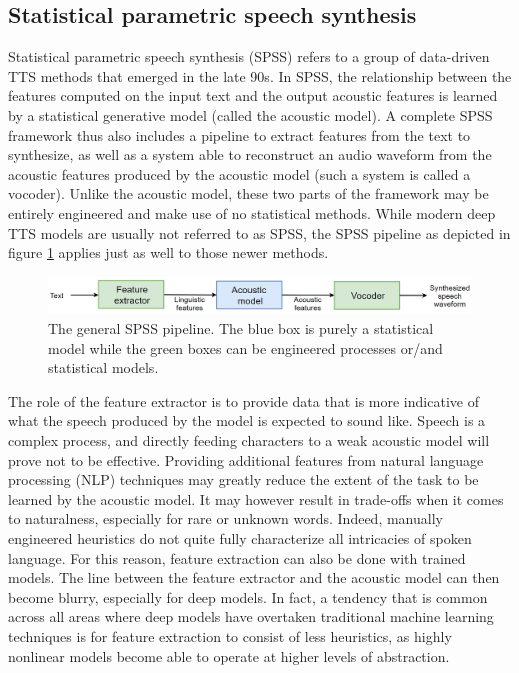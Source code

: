 \documentclass[a4paper, oneside, 12pt, english]{article}
\begin{document}
\subsection{Statistical parametric speech synthesis}
Statistical parametric speech synthesis (SPSS) refers to a group of data-driven TTS methods that emerged in the late 90s. In SPSS, the relationship between the features computed on the input text and the output acoustic features is learned by a statistical generative model (called the acoustic model). A complete SPSS framework thus also includes a pipeline to extract features from the text to synthesize, as well as a system able to reconstruct an audio waveform from the acoustic features produced by the acoustic model (such a system is called a vocoder). Unlike the acoustic model, these two parts of the framework may be entirely engineered and make use of no statistical methods. While modern deep TTS models are usually not referred to as SPSS, the SPSS pipeline as depicted in figure \ref{spss_framework} applies just as well to those newer methods.

\begin{figure}[h]
	\centering
	\includegraphics[width=\linewidth]{images/spss_framework.png}
	\caption{The general SPSS pipeline. The blue box is purely a statistical model while the green boxes can be engineered processes or/and statistical models.}
	\label{spss_framework}
\end{figure}

The role of the feature extractor is to provide data that is more indicative of what the speech produced by the model is expected to sound like. Speech is a complex process, and directly feeding characters to a weak acoustic model will prove not to be effective. Providing additional features from natural language processing (NLP) techniques may greatly reduce the extent of the task to be learned by the acoustic model. It may however result in trade-offs when it comes to naturalness, especially for rare or unknown words. Indeed, manually engineered heuristics do not quite fully characterize all intricacies of spoken language. For this reason, feature extraction can also be done with trained models. The line between the feature extractor and the acoustic model can then become blurry, especially for deep models. In fact, a tendency that is common across all areas where deep models have overtaken traditional machine learning techniques is for feature extraction to consist of less heuristics, as highly nonlinear models become able to operate at higher levels of abstraction.
\end{document}
